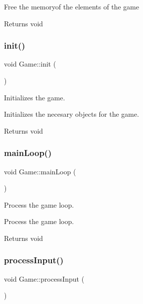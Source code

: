 Free the memoryof the elements of the game

\begin{DoxyReturn}{Returns}
void 
\end{DoxyReturn}
\mbox{\label{class_game_a6f3a33940524b6ba9d83f627ccb14bbf}} 
\subsubsection{\texorpdfstring{init()}{init()}}
{\footnotesize\ttfamily void Game\+::init (\begin{DoxyParamCaption}{ }\end{DoxyParamCaption})}



Initializes the game. 

Initializes the necesary objects for the game.

\begin{DoxyReturn}{Returns}
void 
\end{DoxyReturn}
\mbox{\label{class_game_ae89e277761b7dc5bc7a23fd1b4c6f17d}} 
\subsubsection{\texorpdfstring{main\+Loop()}{mainLoop()}}
{\footnotesize\ttfamily void Game\+::main\+Loop (\begin{DoxyParamCaption}{ }\end{DoxyParamCaption})}



Process the game loop. 

Process the game loop.

\begin{DoxyReturn}{Returns}
void 
\end{DoxyReturn}
\mbox{\label{class_game_a815a3ec2787b4b1c4077d28165c380e8}} 
\subsubsection{\texorpdfstring{process\+Input()}{processInput()}}
{\footnotesize\ttfamily void Game\+::process\+Input (\begin{DoxyParamCaption}{ }\end{DoxyParamCaption})}



